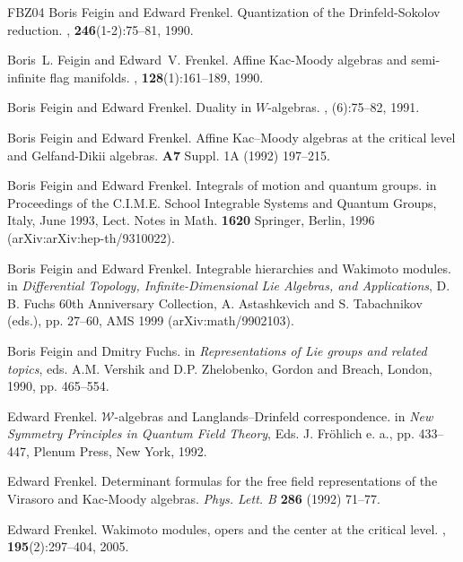 \documentclass{amsart}
\newcommand{\+}{\mathop{\oplus}}
\renewcommand{\*}{{\otimes}}
\newcommand{\mc}{\mathcal}
\theoremstyle{theorem}
\theoremstyle{remark}
\numberwithin{equation}{section}
\begin{document}
\begin{thebibliography}{FBZ04}
Boris Feigin and Edward Frenkel.
\newblock Quantization of the {D}rinfeld-{S}okolov reduction.
, {\bf 246}(1-2):75--81, 1990.

Boris~L. Feigin and Edward~V. Frenkel.
\newblock Affine {K}ac-{M}oody algebras and semi-infinite flag manifolds.
, {\bf 128}(1):161--189, 1990.

Boris Feigin and Edward Frenkel.
\newblock Duality in {$W$}-algebras.
, (6):75--82, 1991.

Boris Feigin and Edward Frenkel.
\newblock Affine Kac--Moody algebras at the critical level and
Gelfand-Dikii algebras.
 {\bf A7} Suppl. 1A (1992)
197--215.

Boris Feigin and Edward Frenkel.
\newblock Integrals of motion and quantum groups.
\newblock in Proceedings of the
C.I.M.E. School Integrable Systems and Quantum Groups, Italy, June
1993, Lect. Notes in Math. {\bf 1620} Springer, Berlin, 1996
(arXiv:arXiv:hep-th/9310022).

Boris Feigin and Edward Frenkel.
\newblock Integrable hierarchies and Wakimoto modules.
\newblock in {\em Differential Topology,
Infinite-Dimensional Lie Algebras, and Applications}, D. B. Fuchs 60th
Anniversary Collection, A. Astashkevich and S. Tabachnikov (eds.),
pp. 27--60, AMS 1999 (arXiv:math/9902103).

Boris Feigin and Dmitry Fuchs.
\newblock in {\em Representations of Lie groups
and related topics}, eds. A.M. Vershik and D.P. Zhelobenko,
Gordon and Breach, London, 1990, pp. 465--554.

 Edward Frenkel.
\newblock ${\mc W}$-algebras and Langlands--Drinfeld correspondence.
\newblock in {\em New Symmetry Principles in Quantum Field Theory},
Eds. J. Fr\"ohlich e. a., pp. 433--447, Plenum Press, New York, 1992.
 
Edward Frenkel.
\newblock
Determinant formulas for the free field representations of the {V}irasoro and {K}ac-{M}oody algebras.
\newblock
{\em Phys. Lett. B} {\bf 286} (1992) 71--77.

Edward Frenkel.
\newblock Wakimoto modules, opers and the center at the critical level.
, {\bf 195}(2):297--404, 2005.


\end{thebibliography}
\end{document}
